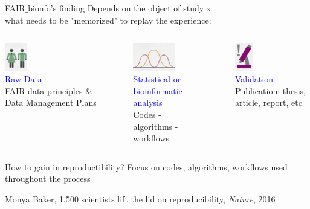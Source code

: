 \begin{frame}{FAIR$\_$bionfo's finding}
Depends on the object of study x \\
\quad \quad \quad what needs to be "memorized" to replay the experience:
\begin{columns}[t]
  \begin{column}{.3\textwidth}\begin{center}
        \includegraphics[height=1.2cm]{01_introduction/images/FAIR_Baker_data.png}\\
        \textcolor{blue}{Raw Data}\\FAIR data principles $\&$ Data Management Plans
      \end{center}\end{column}
      \begin{column}{.05\textwidth}\begin{center}
         $\rightarrow$
      \end{center}\end{column}
      \begin{column}{.3\textwidth}\begin{center}
         \includegraphics[height=1.2cm]{01_introduction/images/FAIR_Baker_process.png}\\
         \textcolor{blue}{Statistical or bioinformatic analysis}\\Codes - algorithms - workflows
      \end{center}\end{column}
      \begin{column}{.05\textwidth}\begin{center}
         $\rightarrow$
      \end{center}\end{column}
      \begin{column}{0.3\textwidth}\begin{center}
         \includegraphics[height=1.2cm]{01_introduction/images/FAIR_Baker_results.png}\\
         \textcolor{blue}{Validation}\\Publication: thesis, article, report, etc
        \end{center}\end{column}
  \end{columns}
  \begin{block}{How to gain in reproductibility?}
   Focus on codes, algorithms, workflows used throughout the process
  \end{block}
  \vfill
  \tiny{Monya Baker, 1,500 scientists lift the lid on reproducibility, \textit{Nature}, 2016}
\end{frame}
